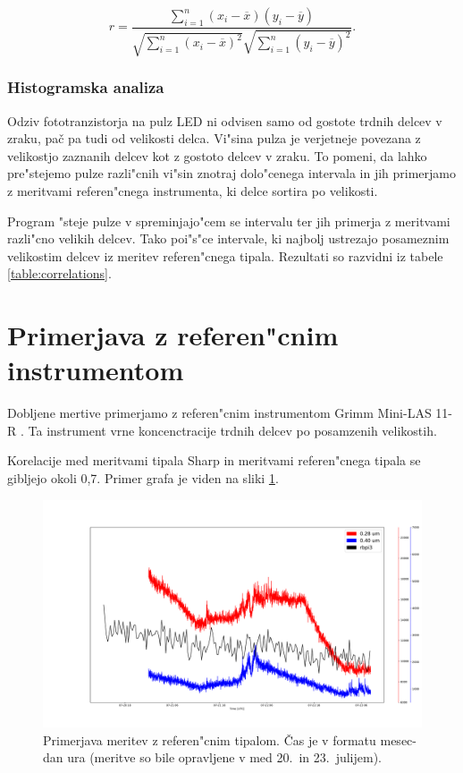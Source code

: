 \documentclass[12pt,a4paper]{article}
\begin{document}
$$
r = \frac{\sum_{i=1}^{n} (x_i - \overline{x}) (y_i - \overline{y})}{\sqrt{\sum_{i=1}^{n} (x_i - \overline{x})^2} \sqrt{\sum_{i=1}^{n} (y_i - \overline{y})^2}}.
$$


\subsubsection{Histogramska analiza}
Odziv fototranzistorja na pulz LED ni odvisen samo od gostote trdnih delcev v zraku, pač pa tudi od velikosti delca. Vi"sina pulza je verjetneje povezana z velikostjo zaznanih delcev kot z gostoto delcev v zraku. To pomeni, da lahko pre"stejemo pulze razli"cnih vi"sin znotraj dolo"cenega intervala in jih primerjamo z meritvami referen"cnega instrumenta, ki delce sortira po velikosti.

Program "steje pulze v spreminjajo"cem se intervalu ter jih primerja z meritvami razli"cno velikih delcev. Tako poi"s"ce intervale, ki najbolj ustrezajo posameznim velikostim delcev iz meritev referen"cnega tipala. Rezultati so razvidni iz tabele \ref{table:correlations}.

\clearpage
\section{Primerjava z referen"cnim instrumentom}
Dobljene mertive primerjamo z referen"cnim instrumentom Grimm Mini-LAS 11-R \cite{grimm-min-las}. Ta instrument vrne koncenctracije trdnih delcev po posamzenih velikostih.

Korelacije med meritvami tipala Sharp in meritvami referen"cnega tipala se gibljejo okoli 0,7. Primer grafa je viden na sliki \ref{comparison}.

\begin{figure}[H]
	\begin{center}
		\includegraphics[width=16cm]{comparison.pdf}
		\caption{Primerjava meritev z referen"cnim tipalom. Čas je v formatu mesec-dan ura (meritve so bile opravljene v med 20.~in 23.~julijem). }
		\label{comparison}
	\end{center}
\end{figure}
\end{document}
